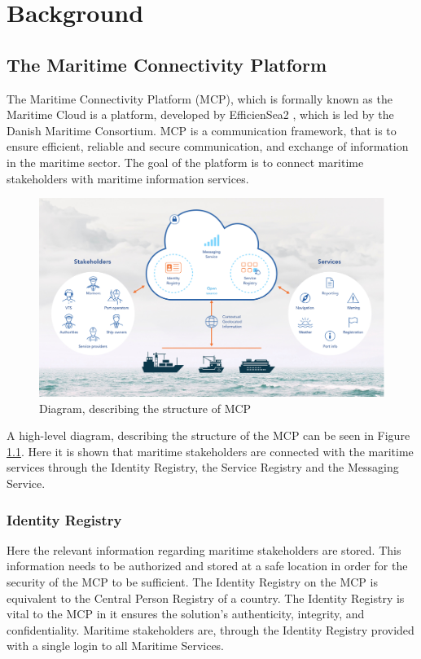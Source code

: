 \chapter{Background}

\section{The Maritime Connectivity Platform}
The Maritime Connectivity Platform (MCP), which is formally known as the Maritime Cloud is a platform, developed by EfficienSea2 \cite{efficienSea2}, which is led by the Danish Maritime Consortium. MCP is a communication framework, that is to ensure efficient, reliable and secure communication, and exchange of information in the maritime sector.
The goal of the platform is to connect maritime stakeholders with maritime information services.
\begin{figure}[H]
	\includegraphics[width=1\textwidth]{figures/MCPStructure}
	\caption{Diagram, describing the structure of MCP \cite{efficienSea2}}
	\label{fig:MCPStruct}
\end{figure}\noindent
A high-level diagram, describing the structure of the MCP can be seen in Figure \ref{fig:MCPStruct}. Here it is shown that maritime stakeholders are connected with the maritime services through the Identity Registry, the Service Registry and the Messaging Service.

\subsection{Identity Registry}
Here the relevant information regarding maritime stakeholders are stored. This information needs to be authorized and stored at a safe location in order for the security of the MCP to be sufficient. The Identity Registry on the MCP is equivalent to the Central Person Registry of a country. The Identity Registry is vital to the MCP in it ensures the solution's authenticity, integrity, and confidentiality. Maritime stakeholders are, through the Identity Registry provided with a single login to all Maritime Services.\cite{efficienSea2}
